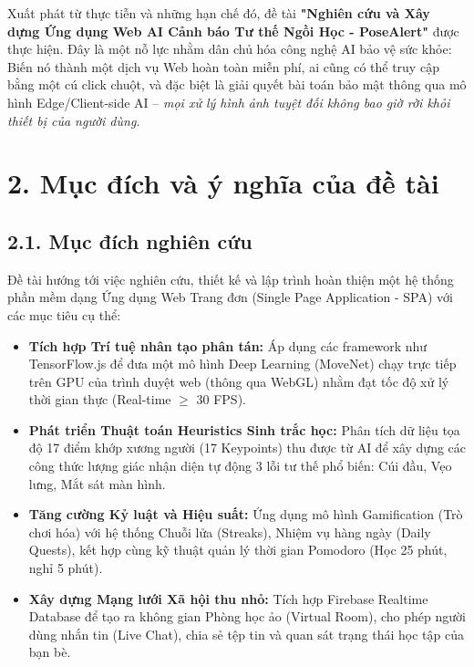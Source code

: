 \documentclass[12pt,a4paper]{report}
\begin{document}
Xuất phát từ thực tiễn và những hạn chế đó, đề tài \textbf{"Nghiên cứu và Xây dựng Ứng dụng Web AI Cảnh báo Tư thế Ngồi Học - PoseAlert"} được thực hiện. Đây là một nỗ lực nhằm dân chủ hóa công nghệ AI bảo vệ sức khỏe: Biến nó thành một dịch vụ Web hoàn toàn miễn phí, ai cũng có thể truy cập bằng một cú click chuột, và đặc biệt là giải quyết bài toán bảo mật thông qua mô hình Edge/Client-side AI – \textit{mọi xử lý hình ảnh tuyệt đối không bao giờ rời khỏi thiết bị của người dùng.}

\section*{2. Mục đích và ý nghĩa của đề tài}
\subsection*{2.1. Mục đích nghiên cứu}
Đề tài hướng tới việc nghiên cứu, thiết kế và lập trình hoàn thiện một hệ thống phần mềm dạng Ứng dụng Web Trang đơn (Single Page Application - SPA) với các mục tiêu cụ thể:
\begin{itemize}[leftmargin=*]
    \item \textbf{Tích hợp Trí tuệ nhân tạo phân tán:} Áp dụng các framework như TensorFlow.js để đưa một mô hình Deep Learning (MoveNet) chạy trực tiếp trên GPU của trình duyệt web (thông qua WebGL) nhằm đạt tốc độ xử lý thời gian thực (Real-time $\ge$ 30 FPS).
    \item \textbf{Phát triển Thuật toán Heuristics Sinh trắc học:} Phân tích dữ liệu tọa độ 17 điểm khớp xương người (17 Keypoints) thu được từ AI để xây dựng các công thức lượng giác nhận diện tự động 3 lỗi tư thế phổ biến: Cúi đầu, Vẹo lưng, Mắt sát màn hình.
    \item \textbf{Tăng cường Kỷ luật và Hiệu suất:} Ứng dụng mô hình Gamification (Trò chơi hóa) với hệ thống Chuỗi lửa (Streaks), Nhiệm vụ hàng ngày (Daily Quests), kết hợp cùng kỹ thuật quản lý thời gian Pomodoro (Học 25 phút, nghỉ 5 phút).
    \item \textbf{Xây dựng Mạng lưới Xã hội thu nhỏ:} Tích hợp Firebase Realtime Database để tạo ra không gian Phòng học ảo (Virtual Room), cho phép người dùng nhắn tin (Live Chat), chia sẻ tệp tin và quan sát trạng thái học tập của bạn bè.
\end{itemize}
\end{document}
